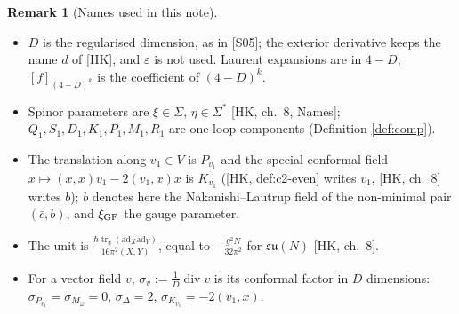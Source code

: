\documentclass[11pt]{article}
\theoremstyle{definition}
\newtheorem{remark}[definition]{Remark}
\numberwithin{equation}{section}
\begin{document}
\begin{remark}[Names used in this note]
\label{rem:names}
\begin{itemize}
\item $D$ is the regularised dimension, as in [S05]; the exterior derivative keeps the name $d$ of [HK], and $\varepsilon$ is not used. Laurent expansions are in $4-D$; $[f]_{(4-D)^{k}}$ is the coefficient of $(4-D)^k$.
\item Spinor parameters are $\xi\in\Sigma$, $\eta\in\Sigma^*$ [HK, ch.~8, Names]; $Q_1,S_1,D_1,K_1,P_1,M_1,R_1$ are one-loop components (Definition \ref{def:comp}).
\item The translation along $v_1\in V$ is $P_{v_1}$ and the special conformal field $x\mapsto(x,x)v_1-2(v_1,x)x$ is $K_{v_1}$ ([HK, def:c2-even] writes $v_1$, [HK, ch.~8] writes $b$); $b$ denotes here the Nakanishi--Lautrup field of the non-minimal pair $(\bar c,b)$, and $\xi_{\rm GF}$ the gauge parameter.
\item The unit is $\frac{\hbar\operatorname{tr}_{\mathfrak g}(\mathrm{ad}_X\mathrm{ad}_Y)}{16\pi^2(X,Y)}$, equal to $-\frac{g^2N}{32\pi^2}$ for $\mathfrak{su}(N)$ [HK, ch.~8].
\item For a vector field $v$, $\sigma_v:=\frac1D\operatorname{div}v$ is its conformal factor in $D$ dimensions: $\sigma_{P_{v_1}}=\sigma_{M_\omega}=0$, $\sigma_\Delta=2$, $\sigma_{K_{v_1}}=-2(v_1,x)$.
\end{itemize}
\end{remark}
\end{document}
